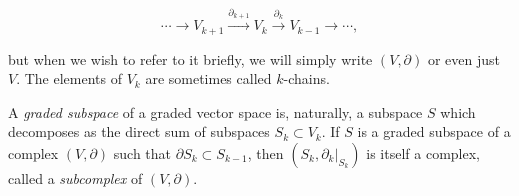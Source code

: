 \[
\cdots\to V_{k+1}\xrightarrow{\partial_{k+1}}V_k\xrightarrow{\partial_k}V_{k-1}\to\cdots,
\]

{but when we wish to refer to it briefly, we will simply write $(V,\partial)$ or even just $V$. The elements of $V_k$ are sometimes called $k$-chains.}

{A \emph{graded subspace} of a graded vector space is, naturally, a subspace $S$ which decomposes as the direct sum of subspaces $S_k\subset V_k$. If $S$ is a graded subspace of a complex $(V,\partial)$ such that $\partial S_k\subset S_{k-1}$, then $(S_k,\partial_k|_{S_k})$ is itself a complex, called a \emph{subcomplex} of $(V,\partial)$.}
